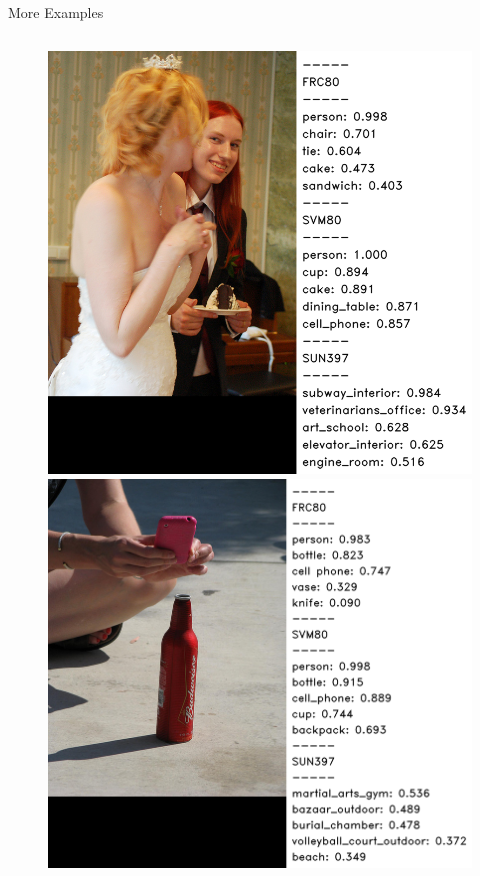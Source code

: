 \documentclass{beamer}
\begin{document}
\begin{frame}{More Examples}
  \begin{figure}[h]
    \begin{columns}
    \centering
    \includegraphics[width=1.2\textwidth]{images/241668.png}
    \hspace{-5mm}
    \centering
    \includegraphics[width=1.2\textwidth]{images/533506.png}

\end{columns}
\end{figure}
\end{frame}
\end{document}
